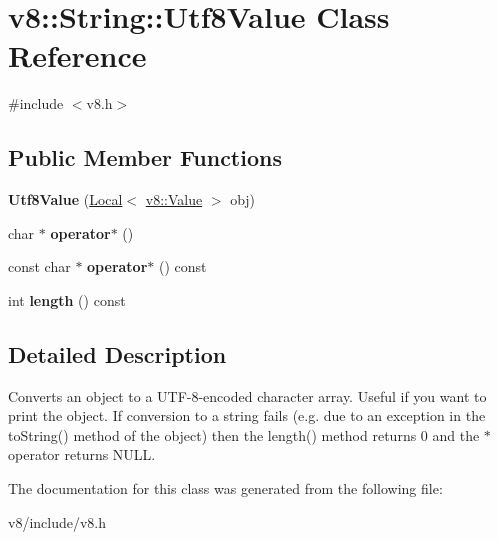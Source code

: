 \hypertarget{classv8_1_1String_1_1Utf8Value}{}\section{v8\+:\+:String\+:\+:Utf8\+Value Class Reference}
\label{classv8_1_1String_1_1Utf8Value}


{\ttfamily \#include $<$v8.\+h$>$}

\subsection*{Public Member Functions}
\begin{DoxyCompactItemize}
\item 
\hypertarget{classv8_1_1String_1_1Utf8Value_ab1a11cc4d69082dfb2b9dd2dc319cfa8}{}{\bfseries Utf8\+Value} (\hyperlink{classv8_1_1Local}{Local}$<$ \hyperlink{classv8_1_1Value}{v8\+::\+Value} $>$ obj)\label{classv8_1_1String_1_1Utf8Value_ab1a11cc4d69082dfb2b9dd2dc319cfa8}

\item 
\hypertarget{classv8_1_1String_1_1Utf8Value_a6cb4914bc426bbe60b0dfdff32213e59}{}char $\ast$ {\bfseries operator$\ast$} ()\label{classv8_1_1String_1_1Utf8Value_a6cb4914bc426bbe60b0dfdff32213e59}

\item 
\hypertarget{classv8_1_1String_1_1Utf8Value_a6557ad0916c472faebd8bfdc3da5c4f7}{}const char $\ast$ {\bfseries operator$\ast$} () const \label{classv8_1_1String_1_1Utf8Value_a6557ad0916c472faebd8bfdc3da5c4f7}

\item 
\hypertarget{classv8_1_1String_1_1Utf8Value_a1e2572abf6adc0786769482df9906f19}{}int {\bfseries length} () const \label{classv8_1_1String_1_1Utf8Value_a1e2572abf6adc0786769482df9906f19}

\end{DoxyCompactItemize}


\subsection{Detailed Description}
Converts an object to a U\+T\+F-\/8-\/encoded character array. Useful if you want to print the object. If conversion to a string fails (e.\+g. due to an exception in the to\+String() method of the object) then the length() method returns 0 and the $\ast$ operator returns N\+U\+L\+L. 

The documentation for this class was generated from the following file\+:\begin{DoxyCompactItemize}
\item 
v8/include/v8.\+h\end{DoxyCompactItemize}
